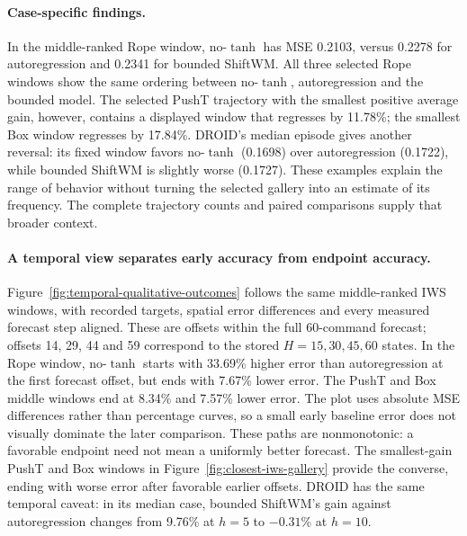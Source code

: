 \paragraph{Case-specific findings.}
In the middle-ranked Rope window, no-$\tanh$ has MSE 0.2103, versus 0.2278 for
autoregression and 0.2341 for bounded ShiftWM. All three selected Rope windows
show the same ordering between no-$\tanh$, autoregression and the bounded
model. The selected PushT trajectory with the smallest positive average gain,
however, contains a displayed window that regresses by 11.78\%; the smallest
Box window regresses by 17.84\%. DROID's median episode gives another reversal:
its fixed window favors no-$\tanh$ (0.1698) over autoregression (0.1722), while
bounded ShiftWM is slightly worse (0.1727). These examples explain the range
of behavior without turning the selected gallery into an estimate of its
frequency. The complete trajectory counts and paired comparisons supply that
broader context.

\paragraph{A temporal view separates early accuracy from endpoint accuracy.}
Figure~\ref{fig:temporal-qualitative-outcomes} follows the same middle-ranked
IWS windows, with recorded targets, spatial error differences and every measured
forecast step aligned. These are offsets within the full 60-command forecast;
offsets 14, 29, 44 and 59 correspond to the stored $H=15,30,45,60$ states.
In the Rope window, no-$\tanh$ starts with 33.69\% higher error than
autoregression at the first forecast offset, but ends with 7.67\% lower error.
The PushT and Box middle windows end at 8.34\% and 7.57\% lower error.
The plot uses absolute MSE differences rather than percentage curves, so a small
early baseline error does not visually dominate the later comparison.
These paths are nonmonotonic: a favorable endpoint need not mean a uniformly
better forecast. The smallest-gain PushT and Box windows in
Figure~\ref{fig:closest-iws-gallery} provide the converse, ending with worse
error after favorable earlier offsets. DROID has the same temporal caveat:
in its median case, bounded ShiftWM's gain against autoregression changes from
9.76\% at $h=5$ to $-0.31$\% at $h=10$.



